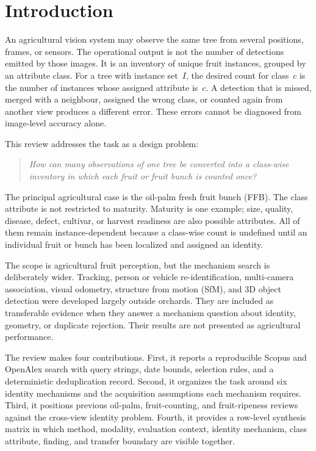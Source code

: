
\section{Introduction}
\label{sec:intro}

An agricultural vision system may observe the same tree from several positions, frames, or sensors. The operational output is not the number of detections emitted by those images. It is an inventory of unique fruit instances, grouped by an attribute class. For a tree with instance set~$I$, the desired count for class~$c$ is the number of instances whose assigned attribute is~$c$. A detection that is missed, merged with a neighbour, assigned the wrong class, or counted again from another view produces a different error. These errors cannot be diagnosed from image-level accuracy alone.

This review addresses the task as a design problem:
\begin{quote}
\emph{How can many observations of one tree be converted into a class-wise inventory in which each fruit or fruit bunch is counted once?}
\end{quote}
The principal agricultural case is the oil-palm fresh fruit bunch (FFB). The class attribute is not restricted to maturity. Maturity is one example; size, quality, disease, defect, cultivar, or harvest readiness are also possible attributes. All of them remain instance-dependent because a class-wise count is undefined until an individual fruit or bunch has been localized and assigned an identity.

The scope is agricultural fruit perception, but the mechanism search is deliberately wider. Tracking, person or vehicle re-identification, multi-camera association, visual odometry, structure from motion (SfM), and 3D object detection were developed largely outside orchards. They are included as transferable evidence when they answer a mechanism question about identity, geometry, or duplicate rejection. Their results are not presented as agricultural performance.

The review makes four contributions. First, it reports a reproducible Scopus and OpenAlex search with query strings, date bounds, selection rules, and a deterministic deduplication record. Second, it organizes the task around six identity mechanisms and the acquisition assumptions each mechanism requires. Third, it positions previous oil-palm, fruit-counting, and fruit-ripeness reviews against the cross-view identity problem. Fourth, it provides a row-level synthesis matrix in which method, modality, evaluation context, identity mechanism, class attribute, finding, and transfer boundary are visible together.

